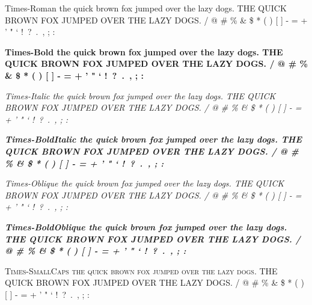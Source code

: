 \documentclass{article}
\begin{document}
{\selectfont
Times-Roman \newline
the quick brown fox jumped over the lazy dogs. \newline
THE QUICK BROWN FOX JUMPED OVER THE LAZY DOGS.  / @ \# \% \& \$ * ( ) [ ] - = + ' " ` !\ ?\ .\ , ; : \par
{\bfseries
Times-Bold \newline
the quick brown fox jumped over the lazy dogs. \newline
THE QUICK BROWN FOX JUMPED OVER THE LAZY DOGS.  / @ \# \% \& \$ * ( ) [ ] - = + ' " ` !\ ?\ .\ , ; : }\par
{\itshape
Times-Italic \newline
the quick brown fox jumped over the lazy dogs. \newline
THE QUICK BROWN FOX JUMPED OVER THE LAZY DOGS.  / @ \# \% \& \$ * ( ) [ ] - = + ' " ` !\ ?\ .\ , ; : }\par
{\bfseries \itshape
Times-BoldItalic \newline
the quick brown fox jumped over the lazy dogs. \newline
THE QUICK BROWN FOX JUMPED OVER THE LAZY DOGS.  / @ \# \% \& \$ * ( ) [ ] - = + ' " ` !\ ?\ .\ , ; : }\par
{\slshape
Times-Oblique \newline
the quick brown fox jumped over the lazy dogs. \newline
THE QUICK BROWN FOX JUMPED OVER THE LAZY DOGS.  / @ \# \% \& \$ * ( ) [ ] - = + ' " ` !\ ?\ .\ , ; : } \par
{\bfseries \slshape
Times-BoldOblique \newline
the quick brown fox jumped over the lazy dogs. \newline
THE QUICK BROWN FOX JUMPED OVER THE LAZY DOGS.  / @ \# \% \& \$ * ( ) [ ] - = + ' " ` !\ ?\ .\ , ; : }\par
{\scshape
Times-SmallCaps \newline
the quick brown fox jumped over the lazy dogs. \newline
THE QUICK BROWN FOX JUMPED OVER THE LAZY DOGS.  / @ \# \% \& \$ * ( ) [ ] - = + ' " ` !\ ?\ .\ , ; : }\par
}
\end{document}
